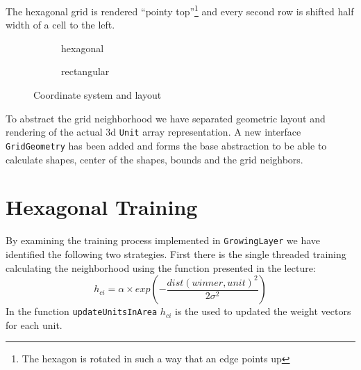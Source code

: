 \documentclass{acm_proc_article-sp}
\begin{document}
The hexagonal grid is rendered ``pointy top''\footnote{The hexagon is rotated in such a way that an edge points up} and every second row is shifted half width of a
cell to the left.

\begin{figure}
    \begin{subfigure}{1\linewidth}
    \centering
    \caption{hexagonal}
    \label{fig:coord-hex}
    \end{subfigure}

    \begin{subfigure}{1\linewidth}
        \centering
    \caption{rectangular}
    \label{fig:coord-rect}
    \end{subfigure}
    \caption{Coordinate system and layout}
    \label{fig:coord}
\end{figure}

To abstract the grid neighborhood we have separated geometric layout and rendering of the actual 3d \lstinline!Unit! array
representation. A new interface \lstinline!GridGeometry! has been added and forms the base abstraction to be able to calculate shapes, center of the shapes, bounds and the grid neighbors.

\section{Hexagonal Training}

By examining the training process implemented in \lstinline!GrowingLayer! we have identified the following two strategies.
First there is the single threaded training calculating the neighborhood using the function presented in the lecture:
\[
    h_{ci} = \alpha \times exp \left(-\frac{dist(winner,unit)^2}{2\sigma^2}\right)
\]
In the function \lstinline!updateUnitsInArea! $h_{ci}$ is the used to updated the weight vectors for each unit.
\end{document}
